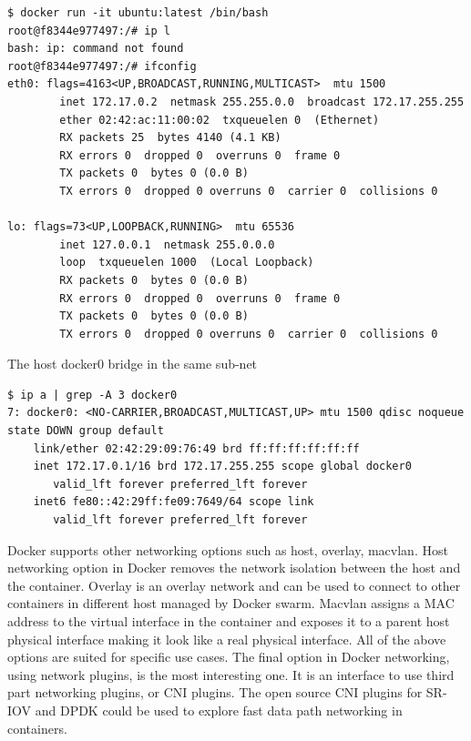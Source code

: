 \documentclass[english, 12pt, a4paper, elec, utf8, a-1b, online]{aaltothesis}
\begin{document}
\begin{lstlisting}[basicstyle={\small\ttfamily}]
$ docker run -it ubuntu:latest /bin/bash
root@f8344e977497:/# ip l
bash: ip: command not found
root@f8344e977497:/# ifconfig 
eth0: flags=4163<UP,BROADCAST,RUNNING,MULTICAST>  mtu 1500
        inet 172.17.0.2  netmask 255.255.0.0  broadcast 172.17.255.255
        ether 02:42:ac:11:00:02  txqueuelen 0  (Ethernet)
        RX packets 25  bytes 4140 (4.1 KB)
        RX errors 0  dropped 0  overruns 0  frame 0
        TX packets 0  bytes 0 (0.0 B)
        TX errors 0  dropped 0 overruns 0  carrier 0  collisions 0

lo: flags=73<UP,LOOPBACK,RUNNING>  mtu 65536
        inet 127.0.0.1  netmask 255.0.0.0
        loop  txqueuelen 1000  (Local Loopback)
        RX packets 0  bytes 0 (0.0 B)
        RX errors 0  dropped 0  overruns 0  frame 0
        TX packets 0  bytes 0 (0.0 B)
        TX errors 0  dropped 0 overruns 0  carrier 0  collisions 0
\end{lstlisting}
The host docker0 bridge in the same sub-net
\begin{lstlisting}[basicstyle={\small\ttfamily}]
$ ip a | grep -A 3 docker0
7: docker0: <NO-CARRIER,BROADCAST,MULTICAST,UP> mtu 1500 qdisc noqueue state DOWN group default 
    link/ether 02:42:29:09:76:49 brd ff:ff:ff:ff:ff:ff
    inet 172.17.0.1/16 brd 172.17.255.255 scope global docker0
       valid_lft forever preferred_lft forever
    inet6 fe80::42:29ff:fe09:7649/64 scope link 
       valid_lft forever preferred_lft forever
\end{lstlisting}

Docker supports other networking options such as host, overlay, macvlan. Host networking option in Docker removes the network isolation between the host and the container. Overlay is an overlay network and can be used to connect to other containers in different host managed by Docker swarm. Macvlan assigns a MAC address to the virtual interface in the container and exposes it to a parent host physical interface making it look like a real physical interface. All of the above options are suited for specific use cases. The final option in Docker networking, using network plugins, is the most interesting one. It is an interface to use third part networking plugins, or CNI plugins. The open source CNI plugins for SR-IOV and DPDK could be used to explore fast data path networking in containers.
\end{document}
